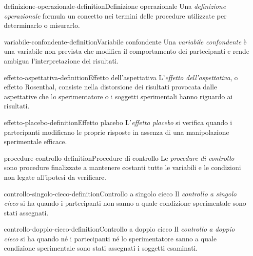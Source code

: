 \documentclass[preview]{standalone}
\begin{document}
\begin{snippetdefinition}{definizione-operazionale-definition}{Definizione operazionale}
    Una \emph{definizione operazionale} formula un concetto nei termini delle
    procedure utilizzate per determinarlo o misurarlo.
\end{snippetdefinition}

\begin{snippetdefinition}{variabile-confondente-definition}{Variabile confondente}
    Una \emph{variabile confondente} è una variabile non prevista che modifica
    il comportamento dei partecipanti e rende ambigua l'interpretazione dei
    risultati.
\end{snippetdefinition}

\begin{snippetdefinition}{effetto-aspettativa-definition}{Effetto dell'aspettativa}
    L'\emph{effetto dell'aspettativa}, o effetto Rosenthal, consiste nella
    distorsione dei risultati provocata dalle aspettative che lo sperimentatore
    o i soggetti sperimentali hanno riguardo ai risultati.
\end{snippetdefinition}

\begin{snippetdefinition}{effetto-placebo-definition}{Effetto placebo}
    L'\emph{effetto placebo} si verifica quando i partecipanti modificano le
    proprie risposte in assenza di una manipolazione sperimentale efficace.
\end{snippetdefinition}

\begin{snippetdefinition}{procedure-controllo-definition}{Procedure di controllo}
    Le \emph{procedure di controllo} sono procedure finalizzate a mantenere
    costanti tutte le variabili e le condizioni non legate all'ipotesi da
    verificare.
\end{snippetdefinition}

\begin{snippetdefinition}{controllo-singolo-cieco-definition}{Controllo a singolo cieco}
    Il \emph{controllo a singolo cieco} si ha quando i partecipanti non sanno a
    quale condizione sperimentale sono stati assegnati.
\end{snippetdefinition}

\begin{snippetdefinition}{controllo-doppio-cieco-definition}{Controllo a doppio cieco}
    Il \emph{controllo a doppio cieco} si ha quando né i partecipanti né lo
    sperimentatore sanno a quale condizione sperimentale sono stati assegnati i
    soggetti esaminati.
\end{snippetdefinition}
\end{document}
